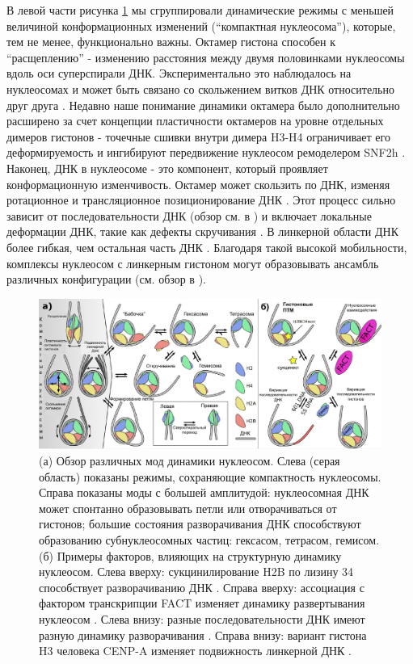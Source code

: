     В левой части рисунка \ref{fig:part2_1_f2} мы сгруппировали динамические режимы с меньшей величиной конформационных изменений (``компактная нуклеосома''), которые, тем не менее, функционально важны. Октамер гистона способен к ``расщеплению'' - изменению расстояния между двумя половинками нуклеосомы вдоль оси суперспирали ДНК. Экспериментально это наблюдалось на  нуклеосомах \cite{ngo_nucleosomes_2015,falk_cenp-c_2015} и может быть связано со скольжением витков ДНК относительно друг друга \cite{falk_cenp-c_2016}. Недавно наше понимание динамики октамера было дополнительно расширено за счет концепции пластичности октамеров на уровне отдельных димеров гистонов - точечные сшивки внутри димера H3-H4 ограничивает его деформируемость и ингибируют передвижение нуклеосом ремоделером SNF2h \cite{sinha_distortion_2017}. Наконец, ДНК в нуклеосоме - это компонент, который проявляет конформационную изменчивость. Октамер может скользить по ДНК, изменяя ротационное и трансляционное позиционирование ДНК \cite{shaytan_hydroxyl-radical_2017,shaytan_structural_2018}. Этот процесс сильно зависит от последовательности ДНК (обзор см. в \cite{eslami-mossallam_nucleosome_2016}) и включает локальные деформации ДНК, такие как дефекты скручивания \cite{edayathumangalam_nucleosomes_2005}. В линкерной области ДНК более гибкая, чем остальная часть ДНК \cite{gansen_structural_2009}. Благодаря такой высокой мобильности, комплексы нуклеосом с линкерным гистоном могут образовывать ансамбль различных конфигурации (см. обзор в \cite{ozturk_toward_2018}).


\begin{figure} [H]
    \centering
    \includegraphics [width=\textwidth]{images/p2/cosb/part2_1_f2.pdf}
    \caption[Моды динамики нуклеосом]{(а) Обзор различных мод динамики нуклеосом. Слева (серая область) показаны режимы, сохраняющие компактность нуклеосомы. Справа показаны моды с большей амплитудой: нуклеосомная ДНК может спонтанно образовывать петли или отворачиваться от гистонов; большие состояния разворачивания ДНК способствуют образованию субнуклеосомных частиц: гексасом, тетрасом, гемисом.
    (б) Примеры факторов, влияющих на структурную динамику нуклеосом. Слева вверху: сукцинилирование H2B по лизину 34 способствует разворачиванию ДНК \cite{jing_site-specific_2018}. Справа вверху: ассоциация с фактором транскрипции FACT изменяет динамику развертывания нуклеосом \cite{valieva_large-scale_2016}. Слева внизу: разные последовательности ДНК имеют разную динамику разворачивания \cite{mauney_local_2018}. Справа внизу: вариант гистона H3 человека CENP-A изменяет подвижность линкерной ДНК \cite{roulland_flexible_2016}.}
    \label{fig:part2_1_f2}
\end{figure}



